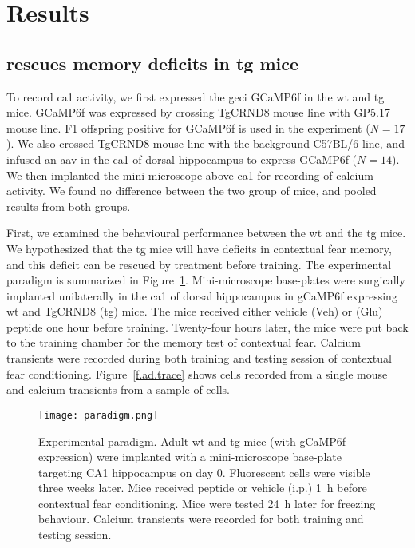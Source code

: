 \section{Results}


\subsection{\tglu{} rescues memory deficits in \gls{tg} mice}

To record \gls{ca1} activity, we first expressed the \gls{geci} GCaMP6f in the \gls{wt} and \gls{tg} mice. GCaMP6f was expressed by crossing TgCRND8 mouse line with GP5.17 mouse line. F1 offspring positive for GCaMP6f is used in the experiment ($N=17$). We also crossed TgCRND8 mouse line with the background C57BL/6 line, and infused an \gls{aav} in the \gls{ca1} of dorsal hippocampus to express GCaMP6f ($N=14$). We then implanted the mini-microscope above \gls{ca1} for recording of calcium activity. We found no difference between the two group of mice, and pooled results from both groups. 

First, we examined the behavioural performance between the \gls{wt} and the \gls{tg} mice. We hypothesized that the \gls{tg} mice will have deficits in contextual fear memory, and this deficit can be rescued by \tglu{} treatment before training.  The experimental paradigm is summarized in Figure~\ref{f.ad.paradigm}. Mini-microscope base-plates were surgically implanted unilaterally in the \gls{ca1} of dorsal hippocampus in gCaMP6f expressing \gls{wt} and TgCRND8 (\gls{tg}) mice. The mice received either vehicle (Veh) or \tglu{} (Glu) peptide one hour before training. Twenty-four hours later, the mice were put back to the training chamber for the memory test of contextual fear. Calcium transients were recorded during both training and testing session of contextual fear conditioning. Figure~\ref{f.ad.trace} shows cells recorded from a single mouse and calcium transients from a sample of cells.
\begin{figure}[h]
    \texttt{[image: paradigm.png]}
    \caption[Experimental paradigm for contextual fear conditioning.]{Experimental paradigm. Adult \gls{wt} and \gls{tg} mice (with gCaMP6f expression) were implanted with a mini-microscope base-plate targeting CA1 hippocampus on day 0. Fluorescent cells were visible three weeks later. Mice received \tglu{} peptide or vehicle (i.p.) \SI{1}{\hour} before contextual fear conditioning. Mice were tested \SI{24}{\hour} later for freezing behaviour. Calcium transients were recorded for both training and testing session. \label{f.ad.paradigm}}
\end{figure}


